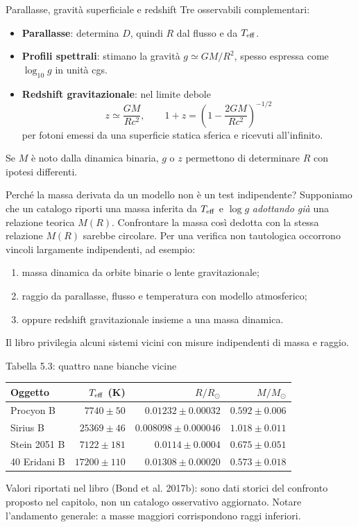\begin{frame}[t]{Parallasse, gravità superficiale e redshift}
\small
Tre osservabili complementari:
\begin{itemize}
\item \textbf{Parallasse}: determina $D$, quindi $R$ dal flusso e da $T_{\rm eff}$.
\item \textbf{Profili spettrali}: stimano la gravità $g\simeq GM/R^2$, spesso espressa come $\log_{10}g$ in unità cgs.
\item \textbf{Redshift gravitazionale}: nel limite debole
\[
z\simeq\frac{GM}{Rc^2},\qquad
1+z=\left(1-\frac{2GM}{Rc^2}\right)^{-1/2}
\]
per fotoni emessi da una superficie statica sferica e ricevuti all'infinito.
\end{itemize}
Se $M$ è noto dalla dinamica binaria, $g$ o $z$ permettono di determinare $R$ con ipotesi differenti.
\end{frame}

\begin{frame}[t]{Perché la massa derivata da un modello non è un test indipendente?}
\small
Supponiamo che un catalogo riporti una massa inferita da $T_{\rm eff}$ e $\log g$ \emph{adottando già} una relazione teorica $M(R)$.
\medskip
Confrontare la massa così dedotta con la stessa relazione $M(R)$ sarebbe circolare.
\medskip
Per una verifica non tautologica occorrono vincoli largamente indipendenti, ad esempio:
\begin{enumerate}
\item massa dinamica da orbite binarie o lente gravitazionale;
\item raggio da parallasse, flusso e temperatura con modello atmosferico;
\item oppure redshift gravitazionale insieme a una massa dinamica.
\end{enumerate}
Il libro privilegia alcuni sistemi vicini con misure indipendenti di massa e raggio.
\end{frame}

\begin{frame}[t]{Tabella 5.3: quattro nane bianche vicine}
\small
\begin{center}
\begin{tabular}{lrrr}
\hline
Oggetto & $T_{\rm eff}$ (K) & $R/R_\odot$ & $M/M_\odot$\\\hline
Procyon B & $7740\pm50$ & $0.01232\pm0.00032$ & $0.592\pm0.006$\\
Sirius B & $25369\pm46$ & $0.008098\pm0.000046$ & $1.018\pm0.011$\\
Stein 2051 B & $7122\pm181$ & $0.0114\pm0.0004$ & $0.675\pm0.051$\\
40 Eridani B & $17200\pm110$ & $0.01308\pm0.00020$ & $0.573\pm0.018$\\\hline
\end{tabular}
\end{center}
\medskip
Valori riportati nel libro (Bond et al. 2017b): sono dati storici del confronto proposto nel capitolo, non un catalogo osservativo aggiornato.
\medskip
Notare l'andamento generale: a masse maggiori corrispondono raggi inferiori.
\end{frame}

